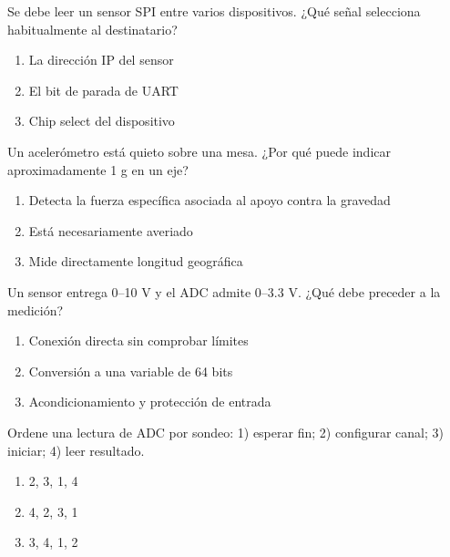 \noindent\begin{minipage}{\linewidth}\setlength{\parskip}{4pt}\label{q:H-060}
Se debe leer un sensor SPI entre varios dispositivos. ¿Qué señal selecciona habitualmente al destinatario?
\begin{enumerate}[label=\Alph*),nosep]
\item La dirección IP del sensor
\item El bit de parada de UART
\item Chip select del dispositivo
\end{enumerate}\end{minipage}\par\medskip

\noindent\begin{minipage}{\linewidth}\setlength{\parskip}{4pt}\label{q:H-061}
Un acelerómetro está quieto sobre una mesa. ¿Por qué puede indicar aproximadamente 1 g en un eje?
\begin{enumerate}[label=\Alph*),nosep]
\item Detecta la fuerza específica asociada al apoyo contra la gravedad
\item Está necesariamente averiado
\item Mide directamente longitud geográfica
\end{enumerate}\end{minipage}\par\medskip

\noindent\begin{minipage}{\linewidth}\setlength{\parskip}{4pt}\label{q:H-062}
Un sensor entrega 0–10 V y el ADC admite 0–3.3 V. ¿Qué debe preceder a la medición?
\begin{enumerate}[label=\Alph*),nosep]
\item Conexión directa sin comprobar límites
\item Conversión a una variable de 64 bits
\item Acondicionamiento y protección de entrada
\end{enumerate}\end{minipage}\par\medskip

\noindent\begin{minipage}{\linewidth}\setlength{\parskip}{4pt}\label{q:H-063}
Ordene una lectura de ADC por sondeo: 1) esperar fin; 2) configurar canal; 3) iniciar; 4) leer resultado.
\begin{enumerate}[label=\Alph*),nosep]
\item 2, 3, 1, 4
\item 4, 2, 3, 1
\item 3, 4, 1, 2
\end{enumerate}\end{minipage}\par\medskip

